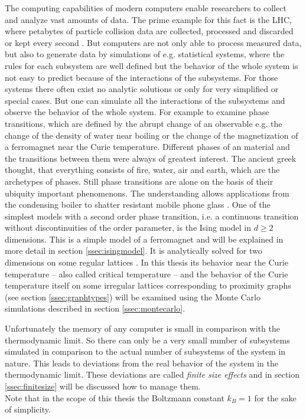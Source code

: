 The computing capabilities of modern computers enable researchers to
collect and analyze vast amounts of data. The prime example for this fact
is the LHC, where petabytes of particle collision data are collected,
processed and discarded or kept every second \cite{LHC}.
But computers are not only able to process measured data, but
also to generate data by simulations of e.g. statistical systems, where
the rules for each subsystem are well defined but the behavior of the
whole system is not easy to predict because of the interactions of the
subsystems. For those systems there often exist no analytic solutions
or only for very simplified or special cases. But one can simulate all
the interactions of the subsystems and observe the behavior of the whole
system.
For example to examine phase transitions, which are defined by the abrupt
change of an observable e.g. the change of the density of water near
boiling or the change of the magnetization of a ferromagnet near the
Curie temperature.
Different phases of an material and the transitions between them were
always of greatest interest. The ancient greek thought, that everything
consists of fire, water, air and earth, which are the archetypes of
phases. Still phase transitions are alone on the basis of their ubiquity
important phenomenons. The understanding allows applications from the
condensing boiler to shatter resistant mobile phone glass \cite{PJournalGlass}.
One of the simplest models with a second order
phase transition, i.e. a continuous transition without discontinuities of
the order parameter, is the Ising model \cite{Ising1925} in \(d \ge 2\)
dimensions. This is a simple
model of a ferromagnet and will be explained in more detail in section
\ref{ssec:isingmodel}. It is analytically solved for two dimensions on
some regular lattices \cite{Onsager1944} \cite{Wannier1945}.
In this thesis its behavior near the Curie temperature -- also called
critical temperature -- and the behavior of the Curie temperature itself
on some irregular lattices corresponding to proximity graphs
(see section \ref{ssec:graphtypes}) will be examined using the Monte
Carlo simulations described in section \ref{ssec:montecarlo}.

Unfortunately the memory of any computer is small in comparison with the
thermodynamic limit. So there can only be a very small number of
subsystems simulated in comparison to the actual number of subsystems
of the system in nature. This leads to deviations from the real behavior
of the system in the thermodynamic limit. These deviations are called
\emph{finite size effects} and in section \ref{ssec:finitesize} will be
discussed how to manage them.\\

Note that in the scope of this thesis the Boltzmann constant \(k_{B}=1\)
for the sake of simplicity.
